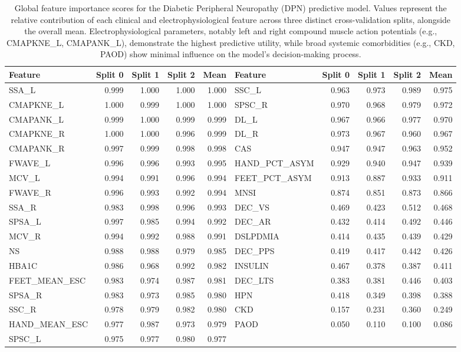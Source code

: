 \documentclass[fleqn,10pt]{wlscirep}
\begin{document}
\begin{table}[ht]
\centering
\footnotesize
\begin{tabular}{lrrrr @{\hskip 0.3in} lrrrr}
\toprule
Feature & Split 0 & Split 1 & Split 2 & Mean & Feature & Split 0 & Split 1 & Split 2 & Mean \\
\midrule
SSA\_L & 0.999 & 1.000 & 1.000 & 1.000 & SSC\_L & 0.963 & 0.973 & 0.989 & 0.975 \\
CMAPKNE\_L & 1.000 & 0.999 & 1.000 & 1.000 & SPSC\_R & 0.970 & 0.968 & 0.979 & 0.972 \\
CMAPANK\_L & 0.999 & 1.000 & 0.999 & 0.999 & DL\_L & 0.967 & 0.966 & 0.977 & 0.970 \\
CMAPKNE\_R & 1.000 & 1.000 & 0.996 & 0.999 & DL\_R & 0.973 & 0.967 & 0.960 & 0.967 \\
CMAPANK\_R & 0.997 & 0.999 & 0.998 & 0.998 & CAS & 0.947 & 0.947 & 0.963 & 0.952 \\
FWAVE\_L & 0.996 & 0.996 & 0.993 & 0.995 & HAND\_PCT\_ASYM & 0.929 & 0.940 & 0.947 & 0.939 \\
MCV\_L & 0.994 & 0.991 & 0.996 & 0.994 & FEET\_PCT\_ASYM & 0.913 & 0.887 & 0.933 & 0.911 \\
FWAVE\_R & 0.996 & 0.993 & 0.992 & 0.994 & MNSI & 0.874 & 0.851 & 0.873 & 0.866 \\
SSA\_R & 0.983 & 0.998 & 0.996 & 0.993 & DEC\_VS & 0.469 & 0.423 & 0.512 & 0.468 \\
SPSA\_L & 0.997 & 0.985 & 0.994 & 0.992 & DEC\_AR & 0.432 & 0.414 & 0.492 & 0.446 \\
MCV\_R & 0.994 & 0.992 & 0.988 & 0.991 & DSLPDMIA & 0.414 & 0.435 & 0.439 & 0.429 \\
NS & 0.988 & 0.988 & 0.979 & 0.985 & DEC\_PPS & 0.419 & 0.417 & 0.442 & 0.426 \\
HBA1C & 0.986 & 0.968 & 0.992 & 0.982 & INSULIN & 0.467 & 0.378 & 0.387 & 0.411 \\
FEET\_MEAN\_ESC & 0.983 & 0.974 & 0.987 & 0.981 & DEC\_LTS & 0.383 & 0.381 & 0.446 & 0.403 \\
SPSA\_R & 0.983 & 0.973 & 0.985 & 0.980 & HPN & 0.418 & 0.349 & 0.398 & 0.388 \\
SSC\_R & 0.978 & 0.979 & 0.982 & 0.980 & CKD & 0.157 & 0.231 & 0.360 & 0.249 \\
HAND\_MEAN\_ESC & 0.977 & 0.987 & 0.973 & 0.979 & PAOD & 0.050 & 0.110 & 0.100 & 0.086 \\
SPSC\_L & 0.975 & 0.977 & 0.980 & 0.977 & & & & & \\
\bottomrule
\end{tabular}
\caption{Global feature importance scores for the Diabetic Peripheral Neuropathy (DPN) predictive model. Values represent the relative contribution of each clinical and electrophysiological feature across three distinct cross-validation splits, alongside the overall mean. Electrophysiological parameters, notably left and right compound muscle action potentials (e.g., CMAPKNE\_L, CMAPANK\_L), demonstrate the highest predictive utility, while broad systemic comorbidities (e.g., CKD, PAOD) show minimal influence on the model's decision-making process.    
}
\label{tab:global_imp}
\end{table}
\end{document}
